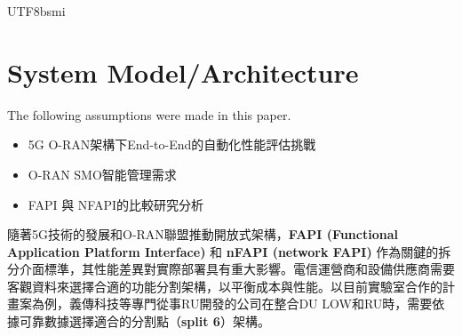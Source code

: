 \documentclass[conference]{IEEEtran}
\begin{document}
\begin{CJK}{UTF8}{bsmi}

\section{System Model/Architecture}




{\color{blue}

The following assumptions were made in this paper.
\begin{itemize}
\item 5G O-RAN架構下End-to-End的自動化性能評估挑戰
\item O-RAN SMO智能管理需求
\item FAPI 與 NFAPI的比較研究分析
\end{itemize}



隨著5G技術的發展和O-RAN聯盟推動開放式架構，\textbf{FAPI (Functional Application Platform Interface)} 和 \textbf{nFAPI (network FAPI)} 作為關鍵的拆分介面標準，其性能差異對實際部署具有重大影響。電信運營商和設備供應商需要客觀資料來選擇合適的功能分割架構，以平衡成本與性能。以目前實驗室合作的計畫案為例，義傳科技等專門從事RU開發的公司在整合DU LOW和RU時，需要依據可靠數據選擇適合的分割點（\textbf{split 6}）架構。

}
\end{CJK}
\end{document}
